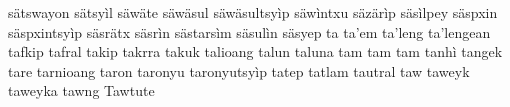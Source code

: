 sätswayon\hspace{2mm}
sätsyìl\hspace{2mm}
säwäte\hspace{2mm}
säwäsul\hspace{2mm}
säwäsultsyìp\hspace{2mm}
säwìntxu\hspace{2mm}
säzärìp\hspace{2mm}
säsìlpey\hspace{2mm}
säspxin\hspace{2mm}
säspxintsyìp\hspace{2mm}
säsrätx\hspace{2mm}
säsrìn\hspace{2mm}
sästarsìm\hspace{2mm}
säsulìn\hspace{2mm}
säsyep\hspace{2mm}
ta\hspace{2mm}
ta'em\hspace{2mm}
ta'leng\hspace{2mm}
ta'lengean\hspace{2mm}
tafkip\hspace{2mm}
tafral\hspace{2mm}
takip\hspace{2mm}
takrra\hspace{2mm}
takuk\hspace{2mm}
talioang\hspace{2mm}
talun\hspace{2mm}
taluna\hspace{2mm}
tam\hspace{2mm}
tam tam\hspace{2mm}
tanhì\hspace{2mm}
tangek\hspace{2mm}
tare\hspace{2mm}
tarnioang\hspace{2mm}
taron\hspace{2mm}
taronyu\hspace{2mm}
taronyutsyìp\hspace{2mm}
tatep\hspace{2mm}
tatlam\hspace{2mm}
tautral\hspace{2mm}
taw\hspace{2mm}
taweyk\hspace{2mm}
taweyka\hspace{2mm}
tawng\hspace{2mm}
Tawtute\hspace{2mm}
